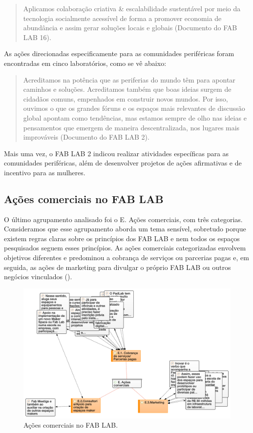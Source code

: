 \documentclass[portuguese]{textolivre}
\begin{document}
\begin{quote}
    Aplicamos colaboração criativa \& escalabilidade sustentável por meio da tecnologia socialmente acessível de forma a promover economia de abundância e assim gerar soluções locais e globais (Documento do FAB LAB 16).
\end{quote}

As ações direcionadas especificamente para as comunidades periféricas foram encontradas em cinco laboratórios, como se vê abaixo:

\begin{quote}
    Acreditamos na potência que as periferias do mundo têm para apontar caminhos e soluções. Acreditamos também que boas ideias surgem de cidadãos comuns, empenhados em construir novos mundos. Por isso, ouvimos o que os grandes fóruns e os espaços mais relevantes de discussão global apontam como tendências, mas estamos sempre de olho nas ideias e pensamentos que emergem de maneira descentralizada, nos lugares mais improváveis (Documento do FAB LAB 2).
\end{quote}

Mais uma vez, o FAB LAB 2 indicou realizar atividades específicas para as comunidades periféricas, além de desenvolver projetos de ações afirmativas e de incentivo para as mulheres.

\subsection{Ações comerciais no FAB LAB}\label{sec-titulo}
O último agrupamento analisado foi o E. Ações comerciais, com três categorias. Consideramos que esse agrupamento aborda um tema sensível, sobretudo porque existem regras claras sobre os princípios dos FAB LAB e nem todos os espaços pesquisados seguem esses princípios. As ações comerciais categorizadas envolvem objetivos diferentes e predominou a cobrança de serviços ou parcerias pagas e, em seguida, as ações de marketing para divulgar o próprio FAB LAB ou outros negócios vinculados ().

\begin{figure}
\centering
\begin{minipage}{\textwidth}
\includegraphics[width=\linewidth]{Fig7.png}
\caption{Ações comerciais no FAB LAB.}
\label{fig7}
\end{minipage}
\end{figure}
\end{document}
